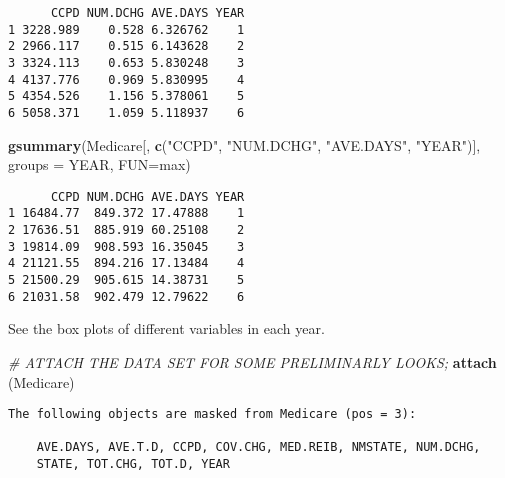 \documentclass[]{book}
\newenvironment{Shaded}{\begin{snugshade}}{\end{snugshade}}
\newcommand{\CommentTok}[1]{\textcolor[rgb]{0.56,0.35,0.01}{\textit{#1}}}
\newcommand{\DataTypeTok}[1]{\textcolor[rgb]{0.13,0.29,0.53}{#1}}
\newcommand{\DecValTok}[1]{\textcolor[rgb]{0.00,0.00,0.81}{#1}}
\newcommand{\KeywordTok}[1]{\textcolor[rgb]{0.13,0.29,0.53}{\textbf{#1}}}
\newcommand{\NormalTok}[1]{#1}
\newcommand{\OperatorTok}[1]{\textcolor[rgb]{0.81,0.36,0.00}{\textbf{#1}}}
\newcommand{\StringTok}[1]{\textcolor[rgb]{0.31,0.60,0.02}{#1}}
\begin{document}
\begin{verbatim}
      CCPD NUM.DCHG AVE.DAYS YEAR
1 3228.989    0.528 6.326762    1
2 2966.117    0.515 6.143628    2
3 3324.113    0.653 5.830248    3
4 4137.776    0.969 5.830995    4
5 4354.526    1.156 5.378061    5
6 5058.371    1.059 5.118937    6
\end{verbatim}

\begin{Shaded}
\begin{Highlighting}[]
\KeywordTok{gsummary}\NormalTok{(Medicare[, }\KeywordTok{c}\NormalTok{(}\StringTok{"CCPD"}\NormalTok{, }\StringTok{"NUM.DCHG"}\NormalTok{, }\StringTok{"AVE.DAYS"}\NormalTok{, }\StringTok{"YEAR"}\NormalTok{)], }\DataTypeTok{groups =}\NormalTok{ YEAR, }\DataTypeTok{FUN=}\NormalTok{max)}
\end{Highlighting}
\end{Shaded}

\begin{verbatim}
      CCPD NUM.DCHG AVE.DAYS YEAR
1 16484.77  849.372 17.47888    1
2 17636.51  885.919 60.25108    2
3 19814.09  908.593 16.35045    3
4 21121.55  894.216 17.13484    4
5 21500.29  905.615 14.38731    5
6 21031.58  902.479 12.79622    6
\end{verbatim}

See the box plots of different variables in each year.

\begin{Shaded}
\begin{Highlighting}[]
\CommentTok{#  ATTACH THE DATA SET FOR SOME PRELIMINARLY LOOKS;}
\KeywordTok{attach}\NormalTok{ (Medicare)}
\end{Highlighting}
\end{Shaded}

\begin{verbatim}
The following objects are masked from Medicare (pos = 3):

    AVE.DAYS, AVE.T.D, CCPD, COV.CHG, MED.REIB, NMSTATE, NUM.DCHG,
    STATE, TOT.CHG, TOT.D, YEAR
\end{verbatim}

\begin{Shaded}
\end{Shaded}
\end{document}
